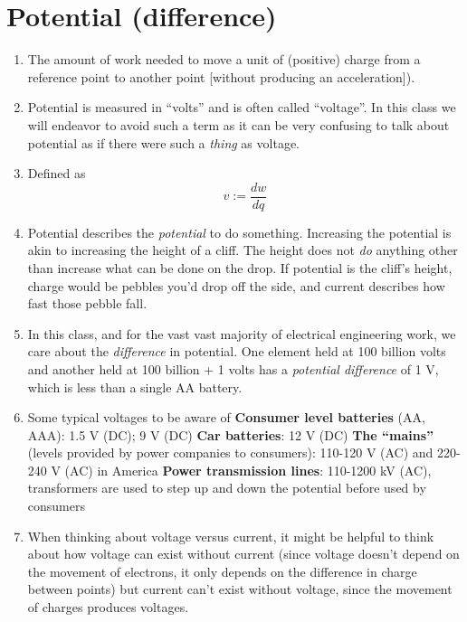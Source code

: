 \documentclass[11pt]{book}
\begin{document}
\section{Potential (difference)}
\begin{enumerate}
	\item The amount of work needed to move a unit of (positive) charge from a reference point to another point [without producing an acceleration]).
	\item Potential is measured in ``volts'' and is often called ``voltage''. In this class we will endeavor to avoid such a term as it can be very confusing to talk about potential as if there were such a \textit{thing} as voltage.
	\item Defined as 
	\begin{equation}
		v:= \frac{dw}{dq}
	\end{equation}
	\item Potential describes the \textit{potential} to do something. Increasing the potential is akin to increasing the height of a cliff. The height does not \textit{do} anything other than increase what can be done on the drop. If potential is the cliff's height, charge would be pebbles you'd drop off the side, and current describes how fast those pebble fall.
	\item In this class, and for the vast vast majority of electrical engineering work, we care about the \textit{difference} in potential. One element held at 100 billion volts and another held at 100 billion + 1 volts has a \textit{potential difference} of 1 V, which is less than a single AA battery.
	\item Some typical voltages to be aware of
	\subitem \textbf{Consumer level batteries} (AA, AAA): 1.5 V (DC); 9 V (DC) 
	\subitem \textbf{Car batteries}: 12 V (DC)
	\subitem \textbf{The ``mains''} (levels provided by power companies to consumers): 110-120 V (AC) and 220-240 V (AC) in America
	\subitem \textbf{Power transmission lines}: 110-1200 kV (AC), transformers are used to step up and down the potential before used by consumers
	\item  When thinking about voltage versus current, it might be helpful to think about how voltage can exist without current (since voltage doesn't depend on the movement of electrons, it only depends on the difference in charge between points) but current can't exist without voltage, since the movement of charges produces voltages. 
\end{enumerate}
\end{document}
